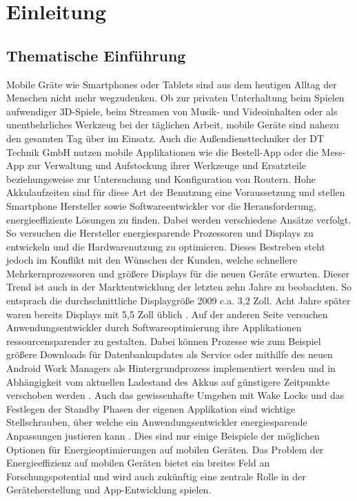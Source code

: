 \chapter{Einleitung}
\section{Thematische Einführung}
Mobile Gräte wie Smartphones oder Tablets sind aus dem heutigen Alltag der Menschen nicht mehr wegzudenken. Ob zur privaten Unterhaltung beim Spielen aufwendiger 3D-Spiele, beim Streamen von Musik- und Videoinhalten oder als unentbehrliches Werkzeug bei der täglichen Arbeit, mobile Geräte sind nahezu den gesamten Tag über im Einsatz. Auch die Außendiensttechniker der DT Technik GmbH nutzen mobile Applikationen wie die Bestell-App oder die Mess-App zur Verwaltung und Aufstockung ihrer Werkzeuge und Ersatzteile beziehungsweise zur Untersuchung und Konfiguration von Routern. Hohe Akkulaufzeiten sind für diese Art der Benutzung eine Voraussetzung und stellen Smartphone Hersteller sowie Softwareentwickler vor die Herausforderung, energieeffiziente Lösungen zu finden.
Dabei werden verschiedene Ansätze verfolgt. So versuchen die Hersteller energiesparende Prozessoren und Displays zu entwickeln und die Hardwarenutzung zu optimieren. Dieses Bestreben steht jedoch im Konflikt mit den Wünschen der Kunden, welche schnellere Mehrkernprozessoren und größere Displays für die neuen Geräte erwarten. Dieser Trend ist auch in der Marktentwicklung der letzten zehn Jahre zu beobachten. So entsprach die durchschnittliche Displaygröße 2009 c.a. 3,2 Zoll. Acht Jahre später waren bereits Displays mit 5,5 Zoll üblich \cite{DisplayGroesse}. Auf der anderen Seite versuchen Anwendungsentwickler durch Softwareoptimierung ihre Applikationen ressourcensparender zu gestalten. Dabei können Prozesse wie zum Beispiel größere Downloads für Datenbankupdates als Service oder mithilfe des neuen Android Work Managers als Hintergrundprozess implementiert werden und in Abhängigkeit vom aktuellen Ladestand des Akkus auf günstigere Zeitpunkte verschoben werden \cite{WorkManager}. Auch das gewissenhafte Umgehen mit Wake Locks und das Festlegen der Standby Phasen der eigenen Applikation sind wichtige Stellschrauben, über welche ein Anwendungsentwickler energiesparende Anpassungen justieren kann \cite{WakeLocks}. Dies sind nur einige Beispiele der möglichen Optionen für Energieoptimierungen auf mobilen Geräten. Das Problem der Energieeffizienz auf mobilen Geräten bietet ein breites Feld an Forschungspotential und wird auch zukünftig eine zentrale Rolle in der Geräteherstellung und App-Entwicklung spielen.

